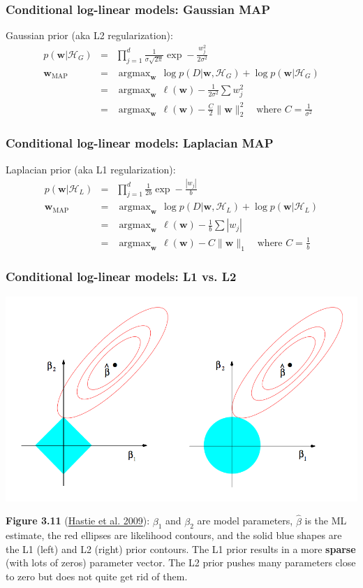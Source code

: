 \documentclass[ignorenonframetext,plain,fleqn]{beamer}
\DeclareMathOperator*{\argmax}{argmax}
\renewcommand{\vec}{\mathbf}
\begin{document}
\begin{frame}\frametitle{Conditional log-linear models: Gaussian MAP} %
Gaussian prior (aka L2 regularization):\begin{eqnarray*}
p(\vec{w}|\mathcal{H}_G) &=& \prod_{j=1}^d \frac{1}{\sigma \sqrt{2\pi}}
\exp -\frac{w_j^2}{2\sigma^2} \\
\vec{w}_\text{MAP} &=& \argmax_\vec{w}\, \log p(D|\vec{w},\mathcal{H}_G)
+ \log p(\vec{w}|\mathcal{H}_G) \\
&=& \argmax_\vec{w}\, \ell(\vec{w}) -\frac{1}{2\sigma^2}\sum w_j^2 \\
&=& \argmax_\vec{w}\, \ell(\vec{w}) - \frac{C}{2}\|\vec{w}\|_2^2 \quad\text{where }C=\frac{1}{\sigma^2}
\end{eqnarray*}
\end{frame}
\begin{frame}\frametitle{Conditional log-linear models: Laplacian MAP} %
Laplacian prior (aka L1 regularization):\begin{eqnarray*}
p(\vec{w}|\mathcal{H}_L) &=& \prod_{j=1}^d \frac{1}{2b} \exp -\frac{|w_j|}{b}\\
\vec{w}_\text{MAP} &=& \argmax_\vec{w}\, \log p(D|\vec{w},\mathcal{H}_L)
+ \log p(\vec{w}|\mathcal{H}_L) \\
&=& \argmax_\vec{w}\, \ell(\vec{w}) -\frac{1}{b}\sum |w_j| \\
&=& \argmax_\vec{w}\, \ell(\vec{w}) - C \|\vec{w}\|_1 \quad\text{where }C=\frac{1}{b}
\end{eqnarray*}
\end{frame}

\begin{frame}\frametitle{Conditional log-linear models: L1 vs. L2} %
\includegraphics[width=.9\textwidth]{images/hastie-fig-3-11.png}

\footnotesize {\bf Figure 3.11}
(\href{http://www-stat.stanford.edu/~tibs/ElemStatLearn}{Hastie et
  al. 2009}): $\beta_1$ and $\beta_2$ are model parameters,
$\hat{\beta}$ is the ML estimate, the red ellipses are likelihood
contours, and the solid blue shapes are the L1 (left) and L2 (right)
prior contours.  The L1 prior results in a more {\bf sparse} (with
lots of zeros) parameter vector.  The L2 prior pushes many parameters
close to zero but does not quite get rid of them.
\end{frame}
\end{document}
